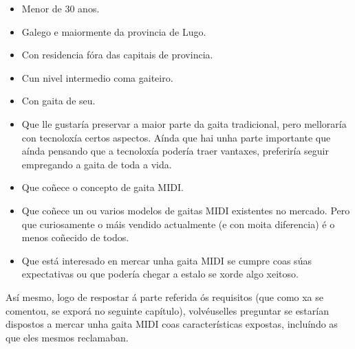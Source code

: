 \begin{itemize}
 \item Menor de 30 anos.
 \item Galego e maiormente da provincia de Lugo.
 \item Con residencia fóra das capitais de provincia.
 \item Cun nivel intermedio coma gaiteiro.
 \item Con gaita de seu.
 \item Que lle gustaría preservar a maior parte da gaita tradicional, pero
       melloraría con tecnoloxía certos aspectos. Aínda que hai unha parte
       importante que aínda pensando que a tecnoloxía podería traer vantaxes,
       preferiría seguir empregando a gaita de toda a vida.
 \item Que coñece o concepto de gaita MIDI.
 \item Que coñece un ou varios modelos de gaitas MIDI existentes no mercado.
       Pero que curiosamente o máis vendido actualmente (e con moita
       diferencia) é o menos coñecido de todos.
 \item Que está interesado en mercar unha gaita MIDI se cumpre coas súas
       expectativas ou que podería chegar a estalo se xorde algo xeitoso.
\end{itemize}

Así mesmo, logo de respostar á parte referida ós requisitos (que como xa se
comentou, se exporá no seguinte capítulo), volvéuselles preguntar se estarían
dispostos a mercar unha gaita MIDI coas características expostas, incluíndo as
que eles mesmos reclamaban.

